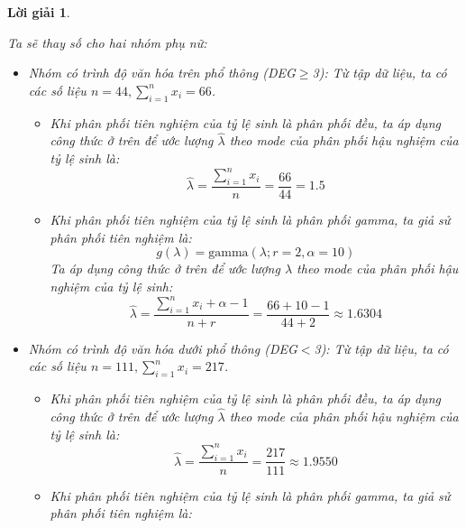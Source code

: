 \documentclass[14pt, a4paper]{article}
\theoremstyle{sltheorem}
\theoremstyle{soltheorem}
\newtheorem*{loigiai}{Lời giải}
\begin{document}
\begin{loigiai}
\begin{enumerate}
        Ta sẽ thay số cho hai nhóm phụ nữ:

        \begin{itemize}
            \item Nhóm có trình độ văn hóa trên phổ thông (DEG$\geq$3):
            Từ tập dữ liệu, ta có các số liệu $n=44, \sum_{i=1}^n x_i=66$.
            \begin{itemize}
                \item Khi phân phối tiên nghiệm của tỷ lệ sinh là phân phối đều, ta áp dụng công thức ở trên để ước lượng $\hat{\lambda}$ theo mode của phân phối hậu nghiệm của tỷ lệ sinh là:
                \begin{equation*}
                    \hat{\lambda} = \dfrac{\sum_{i=1}^n x_i}{n} = \dfrac{66}{44}=1.5
                \end{equation*}
                \item Khi phân phối tiên nghiệm của tỷ lệ sinh là phân phối gamma, ta giả sử phân phối tiên nghiệm là:
                \begin{equation*}
                    g(\lambda) = \text{gamma}(\lambda; r=2, \alpha=10)
                \end{equation*}
                Ta áp dụng công thức ở trên để ước lượng $\hat{\lambda}$ theo mode của phân phối hậu nghiệm của tỷ lệ sinh:
                \begin{equation*}
                    \hat{\lambda} = \dfrac{\sum_{i=1}^n x_i + \alpha - 1}{n + r} = \dfrac{66+10-1}{44 + 2}\approx 1.6304
                \end{equation*}
            \end{itemize}
            \item Nhóm có trình độ văn hóa dưới phổ thông (DEG$<$3):
            Từ tập dữ liệu, ta có các số liệu $n=111, \sum_{i=1}^n x_i=217$.
            \begin{itemize}
                \item Khi phân phối tiên nghiệm của tỷ lệ sinh là phân phối đều, ta áp dụng công thức ở trên để ước lượng $\hat{\lambda}$ theo mode của phân phối hậu nghiệm của tỷ lệ sinh là:
                \begin{equation*}
                    \hat{\lambda} = \dfrac{\sum_{i=1}^n x_i}{n} = \dfrac{217}{111}\approx 1.9550
                \end{equation*}
                \item Khi phân phối tiên nghiệm của tỷ lệ sinh là phân phối gamma, ta giả sử phân phối tiên nghiệm là:
                \begin{equation*}

\end{equation*}
\end{itemize}
\end{itemize}
\end{enumerate}
\end{loigiai}
\end{document}
